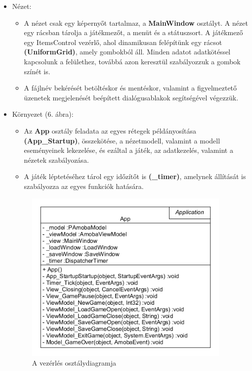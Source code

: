 \documentclass[11pt,a4paper]{article}
\begin{document}
\begin{itemize}
	\newpage
	\thispagestyle{empty}
	\begin{center}
		\colorbox{lightgray}{{\large JPSMA3} \hspace{3cm} {\large Eseményvezérelt alkalmazások 2 3. beadandó} \hspace{5cm} \thepage}
	\end{center}
	\item Nézet:
	\begin{itemize}
		\item A nézet csak egy képernyőt tartalmaz, a \textbf{MainWindow} osztályt. A nézet egy
		rácsban tárolja a játékmezőt, a menüt és a státuszsort. A játékmező egy
		ItemsControl vezérlő, ahol dinamikusan felépítünk egy rácsot
		\textbf{(UniformGrid)}, amely gombokból áll. Minden adatot adatkötéssel
		kapcsolunk a felülethez, továbbá azon keresztül szabályozzuk a gombok
		színét is.
		\item A fájlnév bekérését betöltéskor és mentéskor, valamint a figyelmeztető
		üzenetek megjelenését beépített dialógusablakok segítségével végezzük.
	\end{itemize}
	\item Környezet (6. ábra):
	\begin{itemize}
		\item Az \textbf{App} osztály feladata az egyes rétegek példányosítása
		\textbf{(App\_Startup)}, összekötése, a nézetmodell, valamint a modell eseményeinek lekezelése,
		és ezáltal a játék, az adatkezelés, valamint a nézetek szabályozása.
		\item A játék léptetéséhez tárol egy időzítőt is \textbf{(\_timer)}, amelynek állítását is
		szabályozza az egyes funkciók hatására.
	\end{itemize}
	\begin{figure}[h]
		\centering
		\includegraphics[width=10cm]{UMLs/App.png}
		\caption{A vezérlés osztálydiagramja}
	\end{figure}

\end{itemize}
\end{document}
